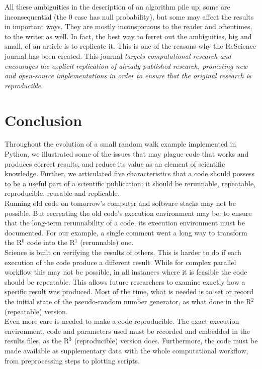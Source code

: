 \documentclass[a4paper,11pt]{article}
\begin{document}
All these ambiguities in the description of an algorithm pile up; some are inconsequential (the 0 case has null probability), but some may affect the results in important ways. They are mostly inconspicuous to the reader and oftentimes, to the writer as well. In fact, the best way to ferret out the ambiguities, big and small, of an article is to replicate it. This is one of the reasons why the ReScience journal \citep{Rougier:2017} has been created. This journal {\em targets  computational research and encourages the explicit replication of already published research, promoting new and open-source implementations in order to ensure that the original research is reproducible}.\\

\section*{Conclusion}

Throughout the evolution of a small random walk example implemented in Python, we illustrated some of the issues that may plague code that works and produces correct results, and reduce its value as an element of scientific knowledge.
Further, we articulated five characteristics that a code should possess to be a useful part of a scientific publication: it should be rerunnable, repeatable, reproducible, reusable and replicable.\\

Running old code on tomorrow’s computer and software stacks may not be possible. But recreating the old code’s execution environment may be: to ensure that the long-term rerunnability of a code, its execution environment must be documented. For our example, a single comment went a long way to transform the R$^0$ code into the R$^1$ (rerunnable) one.\\

Science is built on verifying the results of others. This is harder to do if each execution of the code produce a different result. While for complex parallel workflow this may not be possible, in all instances where it is feasible the code should be repeatable. This allows future researchers to examine exactly how a specific result was produced. Most of the time, what is needed is to set or record the initial state of the pseudo-random number generator, as what done in the R$^2$ (repeatable) version.\\

Even more care is needed to make a code reproducible. The exact execution environment, code and parameters used must be recorded and embedded in the results files, as the R$^3$ (reproducible) version does. Furthermore, the code must be made available as supplementary data with the whole computational workflow, from preprocessing steps to plotting scripts.\\
\end{document}
